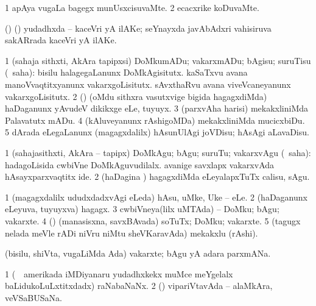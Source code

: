 \bentry
{} 
\gl{\kirxvi}
\expl{}
\bmng
\bnum
\num{1} apAya \mo vugaLa bagegx munUsxcisuvaMte. 
\num{2} ecacxrike koDuvaMte. 
\enum
\emng
\eentry

\bentry
{} 
\gl{\nA}
\expl{}
\bmng
(\birx) (\ca) yudadhxda -- kaceVri yA ilAKe; seYnayxda javAbAdxri vahisiruva sakARrada kaceVri yA ilAKe. 
\emng
\eentry

\bentry
{} 
\gl{\sakirx}
\expl{}
\bmng
\bnum
\num{1} (sahaja sithxti, AkAra tapipxsi) DoMkumADu; vakarxmADu; bAgisu; suruTisu (\rUpa\ saha):  bisilu halagegaLanunx DoMkAgisitutx.  kaSaTxvu avana manoVvaqtitxyanunx vakarxgoLisitutx.  sAvxthaRvu avana viveVcaneyanunx vakarxgoLisitutx. 
\num{2} (\nw) (oMdu sithxra vasutxvige bigida hagagxdiMda) haDaganunx yAvudeV dikikxge eLe, tuyuyx. 
\num{3} (parxvAha harisi) mekakxliniMda Palavatutx mADu. 
\num{4} (kAluveyanunx rAshigoMDa) mekakxliniMda mucicxbiDu. 
\num{5} dArada eLegaLanunx (magagxdalilx) hAsunUlAgi joVDisu; hAsAgi aLavaDisu. 
\enum
\emng

\noindent 
\gl{\akirx}
\expl{}
\bmng
\bnum
\num{1} (sahajasithxti, AkAra -- tapipx) DoMkAgu; bAgu; suruTu; vakarxvAgu (\rUpa\ saha):  hadagoLisida cwbiVne DoMkAguvudilalx.  avanige savxlapx vakarxvAda hAsayxparxvaqtitx ide. 
\num{2} (haDagina \vi) hagagxdiMda eLeyalapxTuTx calisu, sAgu. 
\enum
\emng
\eentry

\bentry
{} 
\gl{\nA}
\expl{}
\bmng
\bnum
\num{1} (magagxdalilx ududxdadxvAgi eLeda) hAsu, uMke, Uke -- eLe. 
\num{2} (haDaganunx eLeyuva, tuyuyxva) hagagx. 
\num{3} cwbiVneya(lilx uMTAda) -- DoMku; bAgu; vakarxte. 
\num{4} (\rUpa) (manasisxna, savxBAvada) soTuTx; DoMku; vakarxte. 
\num{5} (tagugx nelada meVle rADi niVru niMtu sheVKaravAda) mekakxlu (rAshi). 
\enum
\emng
\eentry

\bentry
{} 
\gl{\nA}
\expl{}
\bmng
(bisilu, shiVta, \mo vugaLiMda Ada) vakarxte; bAgu yA adara parxmANa. 
\emng
\eentry

\bentry
{} 
\gl{\nA}
\expl{}
\bmng
\bnum
\num{1} (\kanmu\ \kanu\ amerikada iMDiyanaru yudadhxkekx muMce meYgelalx baLidukoLuLxtitxdadx) raNabaNaNx. 
\num{2} (\AmA) vipariVtavAda -- alaMkAra, veVSaBUSaNa. 
\enum
\emng
\eentry

